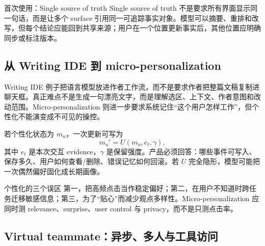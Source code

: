 \begin{knowledgebox}{首次使用：Single source of truth}
Single source of truth 不是要求所有界面显示同一句话，而是让多个 surface 引用同一可追踪事实对象。模型可以摘要、重排和改写，但每个结论应能回到共享来源；用户在一个位置更新事实后，其他位置应明确同步或标注版本。
\end{knowledgebox}

\subsection{从 Writing IDE 到 micro-personalization}

Writing IDE 例子把语言模型放进作者工作流，而不是要求作者把整篇文稿复制进聊天框。真正难点不是生成一句漂亮文字，而是理解选区、上下文、作者意图和改动范围。Micro-personalization 则进一步要求系统记住“这个用户怎样工作”，但个性化不能演变成不可见的操控。




若个性化状态为 $m_u$，一次更新可写为
\[
m_u' = U(m_u,e_t,\gamma),
\]
其中 $e_t$ 是本次交互 evidence，$\gamma$ 是保留强度。产品必须回答：哪些事件可写入、保存多久、用户如何查看/删除、错误记忆如何回滚。若 $U$ 完全隐形，模型可能把一次偶然偏好固化成长期画像。

\begin{warningbox}{个性化的三个误区}
第一，把高频点击当作稳定偏好；第二，在用户不知道时跨任务迁移敏感信息；第三，为了“贴心”而减少观点多样性。Micro-personalization 应同时测 relevance、surprise、user control 与 privacy，而不是只测点击率。
\end{warningbox}


\subsection{Virtual teammate：异步、多人与工具访问}

